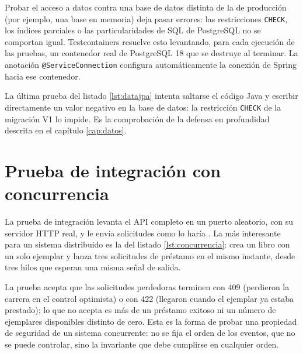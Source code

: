 Probar el acceso a datos contra una base de datos distinta de la de producción (por ejemplo, una base en memoria) deja pasar errores: las restricciones \texttt{CHECK}, los índices parciales o las particularidades de SQL de PostgreSQL no se comportan igual. Testcontainers resuelve esto levantando, para cada ejecución de las pruebas, un contenedor real de PostgreSQL 18 que se destruye al terminar. La anotación \texttt{@ServiceConnection} configura automáticamente la conexión de Spring hacia ese contenedor.





La última prueba del listado \ref{lst:datajpa} intenta saltarse el código Java y escribir directamente un valor negativo en la base de datos: la restricción \texttt{CHECK} de la migración V1 lo impide. Es la comprobación de la defensa en profundidad descrita en el capítulo \ref{cap:datos}.

\section{Prueba de integración con concurrencia}

La prueba de integración levanta el API completo en un puerto aleatorio, con su servidor HTTP real, y le envía solicitudes como lo haría . La más interesante para un sistema distribuido es la del listado \ref{lst:concurrencia}: crea un libro con un solo ejemplar y lanza tres solicitudes de préstamo en el mismo instante, desde tres hilos que esperan una misma señal de salida.



La prueba acepta que las solicitudes perdedoras terminen con 409 (perdieron la carrera en el control optimista) o con 422 (llegaron cuando el ejemplar ya estaba prestado); lo que no acepta es más de un préstamo exitoso ni un número de ejemplares disponibles distinto de cero. Esta es la forma de probar una propiedad de seguridad de un sistema concurrente: no se fija el orden de los eventos, que no se puede controlar, sino la invariante que debe cumplirse en cualquier orden.

